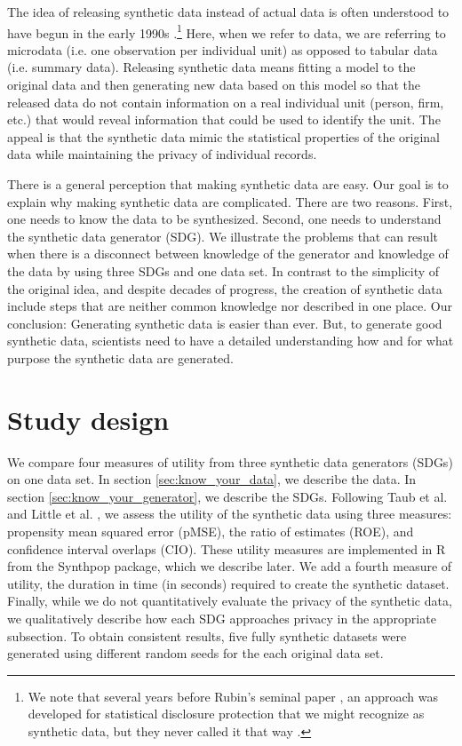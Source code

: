 \documentclass[runningheads]{llncs}
\begin{document}
The idea of releasing synthetic data instead of actual data is often understood to have begun in the early 1990s \cite{rubin1993statistical,little1993statistical}.\footnote{We note that several years before Rubin's seminal paper \cite{rubin1993statistical}, an approach was developed for statistical disclosure protection that we might recognize as synthetic data, but they never called it that way \cite{liew1985data}.}  Here, when we refer to data, we are referring to microdata (i.e. one observation per individual unit) as opposed to tabular data (i.e. summary data).  Releasing synthetic data means fitting a model to the original data and then generating new data based on this model so that the released data do not contain information on a real individual unit (person, firm, etc.) that would reveal information that could be used to identify the unit.  The appeal is that the synthetic data mimic the statistical properties of the original data while maintaining the privacy of individual records.

There is a general perception that making synthetic data are easy.  Our goal is to explain why making synthetic data are complicated.  There are two reasons.  First, one needs to know the data to be synthesized.  Second, one needs to understand the synthetic data generator (SDG).  We illustrate the problems that can result when there is a disconnect between knowledge of the generator and knowledge of the data by using three SDGs and one data set.  In contrast to the simplicity of the original idea, and despite decades of progress, the creation of synthetic data include steps that are neither common knowledge nor described in one place.  Our conclusion: Generating synthetic data is easier than ever. But, to generate good synthetic data, scientists need to have a detailed understanding how and for what purpose the synthetic data are generated.

\section{Study design}\label{sec:study_design}

We compare four measures of utility from three synthetic data generators (SDGs) on one data set.  In section \ref{sec:know_your_data}, we describe the data.  In section \ref{sec:know_your_generator}, we describe the SDGs.  Following Taub et al. \cite{taub2020impact} and Little et al. \cite{little2022comparing}, we assess the utility of the synthetic data using three measures: propensity mean squared error (pMSE), the ratio of estimates (ROE), and confidence interval overlaps (CIO).  These utility measures are implemented in \textsf{R} from the Synthpop package, which we describe later.  We add a fourth measure of utility, the duration in time (in seconds) required to create the synthetic dataset.  Finally, while we do not quantitatively evaluate the privacy of the synthetic data, we qualitatively describe how each SDG approaches privacy in the appropriate subsection.  To obtain consistent results, five fully synthetic datasets were generated using different random seeds for the each original data set.  
\end{document}
